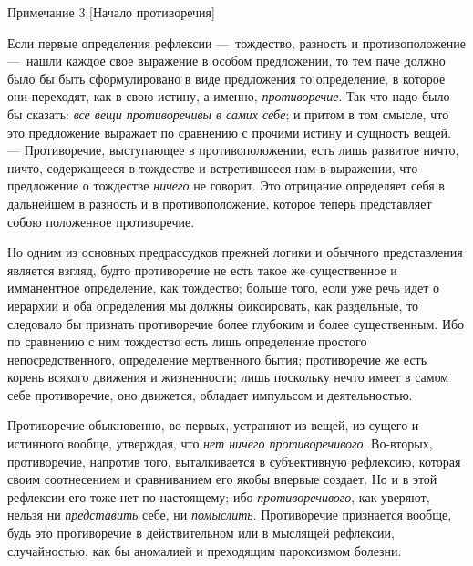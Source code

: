 {\centering
Примечание 3
[Начало противоречия]
\par}

Если первые определения рефлексии —~тождество, разность и противоположение
—~нашли каждое свое выражение в особом предложении, то тем паче должно было
бы быть сформулировано в виде предложения то определение, в которое они
переходят, как в свою истину, а именно,
{\em противоречие}. Так что надо было бы сказать:
{\em все вещи противоречивы в самих себе}; и притом в
том смысле, что это предложение выражает по сравнению с прочими истину и
сущность вещей. — Противоречие, выступающее в противоположении, есть лишь
развитое ничто, ничто, содержащееся в тождестве и встретившееся нам в
выражении, что предложение о тождестве {\em ничего} не
говорит. Это отрицание определяет себя в дальнейшем в разность и в
противоположение, которое теперь представляет собою положенное
противоречие.

Но одним из основных предрассудков прежней логики и обычного представления
является взгляд, будто противоречие не есть такое же существенное и
имманентное определение, как тождество; больше того, если уже речь идет о
иерархии и оба определения мы должны фиксировать, как раздельные, то
следовало бы признать противоречие более глубоким и более существенным. Ибо
по сравнению с ним тождество есть лишь определение простого
непосредственного, определение мертвенного бытия; противоречие же есть
корень всякого движения и жизненности; лишь поскольку нечто имеет в самом
себе противоречие, оно движется, обладает импульсом и деятельностью.

Противоречие обыкновенно, во-первых, устраняют из вещей, из сущего и
истинного вообще, утверждая, что {\em нет ничего
противоречивого}. Во-вторых, противоречие, напротив того, выталкивается в
субъективную рефлексию, которая своим соотнесением и сравниванием его якобы
впервые создает. Но и в этой рефлексии его тоже нет по-настоящему; ибо
{\em противоречивого}, как уверяют, нельзя ни
{\em представить} себе, ни
{\em помыслить}. Противоречие признается вообще, будь
это противоречие в действительном или в мыслящей рефлексии, случайностью,
как бы аномалией и преходящим пароксизмом болезни.


